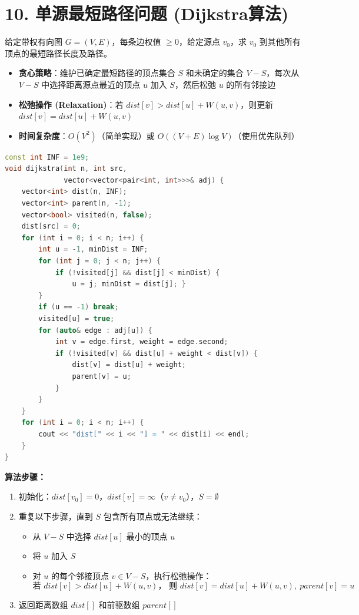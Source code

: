 \section*{10. 单源最短路径问题 (Dijkstra算法)}

给定带权有向图 $G=(V, E)$，每条边权值 $\ge 0$，给定源点 $v_0$，求 $v_0$ 到其他所有顶点的最短路径长度及路径。

\begin{itemize}
    \item \textbf{贪心策略}：维护已确定最短路径的顶点集合 $S$ 和未确定的集合 $V-S$，每次从 $V-S$ 中选择距离源点最近的顶点 $u$ 加入 $S$，然后松弛 $u$ 的所有邻接边
    \item \textbf{松弛操作 (Relaxation)}：若 $dist[v] > dist[u] + W(u, v)$，则更新 $dist[v] = dist[u] + W(u, v)$
    \item \textbf{时间复杂度}：$O(V^2)$（简单实现）或 $O((V+E) \log V)$（使用优先队列）
\end{itemize}

\begin{lstlisting}[language=C++, style=cppstyle]
const int INF = 1e9;
void dijkstra(int n, int src,
              vector<vector<pair<int, int>>>& adj) {
    vector<int> dist(n, INF);
    vector<int> parent(n, -1);
    vector<bool> visited(n, false);
    dist[src] = 0;
    for (int i = 0; i < n; i++) {
        int u = -1, minDist = INF;
        for (int j = 0; j < n; j++) {
            if (!visited[j] && dist[j] < minDist) {
                u = j; minDist = dist[j]; }
        }
        if (u == -1) break;
        visited[u] = true;
        for (auto& edge : adj[u]) {
            int v = edge.first, weight = edge.second;
            if (!visited[v] && dist[u] + weight < dist[v]) {
                dist[v] = dist[u] + weight;
                parent[v] = u;
            }
        }
    }
    for (int i = 0; i < n; i++) {
        cout << "dist[" << i << "] = " << dist[i] << endl;
    }
}
\end{lstlisting}

\textbf{算法步骤：}
\begin{enumerate}
    \item 初始化：$dist[v_0] = 0$，$dist[v] = \infty$（$v \ne v_0$），$S = \emptyset$
    \item 重复以下步骤，直到 $S$ 包含所有顶点或无法继续：
    \begin{itemize}
        \item 从 $V-S$ 中选择 $dist[u]$ 最小的顶点 $u$
        \item 将 $u$ 加入 $S$
        \item 对 $u$ 的每个邻接顶点 $v \in V-S$，执行松弛操作：
        \[ \text{若 } dist[v] > dist[u] + W(u, v)，\text{ 则 } dist[v] = dist[u] + W(u, v), \ parent[v] = u \]
    \end{itemize}
    \item 返回距离数组 $dist[]$ 和前驱数组 $parent[]$
\end{enumerate}


